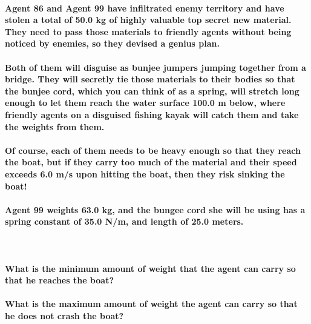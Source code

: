 \paragraph{Agent 86 and Agent 99 have infiltrated enemy territory and have stolen a total of 50.0 kg of highly valuable top secret new material. They need to pass those materials to friendly agents without being noticed by enemies, so they devised a genius plan.\newline}
\paragraph{Both of them will disguise as bunjee jumpers jumping together from a bridge. They will secretly tie those materials to their bodies so that the bunjee cord, which you can think of as a spring, will stretch long enough to let them reach the water surface 100.0 m below, where friendly agents on a disguised fishing kayak will catch them and take the weights from them.\newline}
\paragraph{Of course, each of them needs to be heavy enough so that they reach the boat, but if they carry too much of the material and their speed exceeds 6.0 m/s upon hitting the boat, then they risk sinking the boat!\newline}
\paragraph{Agent 99 weights 63.0 kg, and the bungee cord she will be using has a spring constant of 35.0 N/m, and length of 25.0 meters.\newline}
 
\paragraph{What is the minimum amount of weight that the agent can carry so that he reaches the boat? \newline}
\paragraph{What is the maximum amount of weight the agent can carry so that he does not crash the boat?\newline}